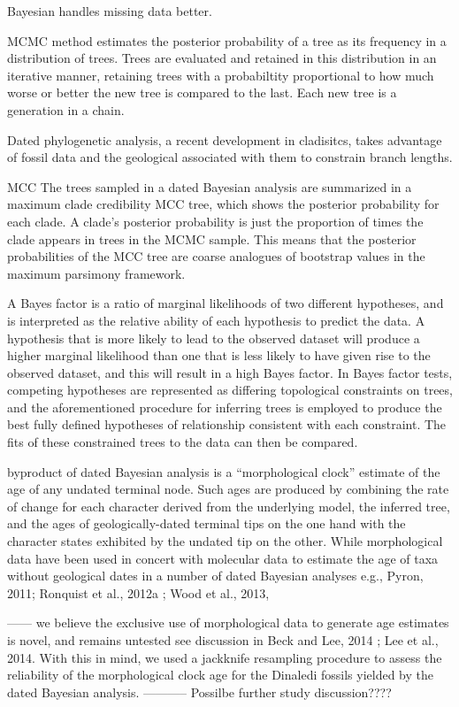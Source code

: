 \documentclass[11pt,letterpaper]{article}
\begin{document}
Bayesian handles missing data better.

MCMC method estimates the posterior probability of a tree as its frequency in a distribution of trees. Trees are evaluated and retained in this distribution in an iterative manner, retaining trees with a probabiltity proportional to how much worse or better the new tree is compared to the last. Each new tree is a generation in a chain.

Dated phylogenetic analysis, a recent development in cladisitcs, takes advantage of fossil data and the geological associated with them to constrain branch lengths.   

MCC The trees sampled in a dated Bayesian analysis are summarized in a maximum clade credibility MCC tree, which shows the posterior probability for each clade. A clade's posterior probability is just the proportion of times the clade appears in trees in the MCMC sample. This means that the posterior probabilities of the MCC tree are coarse analogues of bootstrap values in the maximum parsimony framework.

A Bayes factor is a ratio of marginal likelihoods of two different hypotheses, and is interpreted as the relative ability of each hypothesis to predict the data. A hypothesis that is more likely to lead to the observed dataset will produce a higher marginal likelihood than one that is less likely to have given rise to the observed dataset, and this will result in a high Bayes factor. In Bayes factor tests, competing hypotheses are represented as differing topological constraints on trees, and the aforementioned procedure for inferring trees is employed to produce the best fully defined hypotheses of relationship consistent with each constraint. The fits of these constrained trees to the data can then be compared.

byproduct of dated Bayesian analysis is a “morphological clock” estimate of the age of any undated terminal node. Such ages are produced by combining the rate of change for each character derived from the underlying model, the inferred tree, and the ages of geologically-dated terminal tips on the one hand with the character states exhibited by the undated tip on the other. While morphological data have been used in concert with molecular data to estimate the age of taxa without geological dates in a number of dated Bayesian analyses e.g., Pyron, 2011; Ronquist et al., 2012a ;  Wood et al., 2013, 

------ we believe the exclusive use of morphological data to generate age estimates is novel, and remains untested see discussion in Beck and Lee, 2014 ;  Lee et al., 2014. With this in mind, we used a jackknife resampling procedure to assess the reliability of the morphological clock age for the Dinaledi fossils yielded by the dated Bayesian analysis. ----------- Possilbe further study discussion????
\end{document}
